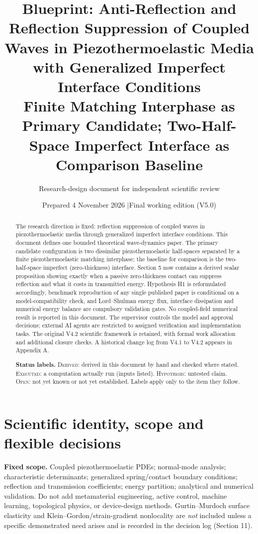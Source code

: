 \documentclass[11pt]{article}
\title{Blueprint: Anti-Reflection and Reflection Suppression of Coupled
Waves in Piezothermoelastic Media with Generalized Imperfect Interface
Conditions\\[6pt]
\large Finite Matching Interphase as Primary Candidate; Two-Half-Space
Imperfect Interface as Comparison Baseline}
\author{Research-design document for independent scientific review}
\date{Prepared 4 November 2026 \quad$\vert$\quad Final working edition (V5.0)}
\begin{document}
\maketitle

\begin{center}
\end{center}

\begin{abstract}
The research direction is fixed: reflection suppression of coupled waves in
piezothermoelastic media through generalized imperfect interface conditions.
This document defines one bounded theoretical wave-dynamics paper. The primary
candidate configuration is two dissimilar piezothermoelastic half-spaces
separated by a finite piezothermoelastic matching interphase; the baseline for
comparison is the two-half-space imperfect (zero-thickness) interface. Section 5
now contains a derived scalar proposition showing exactly when a passive
zero-thickness contact can suppress reflection and what it costs in transmitted
energy. Hypothesis H1 is reformulated accordingly, benchmark reproduction of any
single published paper is conditional on a model-compatibility check, and
Lord--Shulman energy flux, interface dissipation and numerical energy balance
are compulsory validation gates. No coupled-field numerical result is reported in
this document. The supervisor controls the model and approval decisions; external
AI agents are restricted to assigned verification and implementation tasks. The
original V4.2 scientific framework is retained, with formal work allocation and
additional closure checks. A historical change log from V4.1 to V4.2 appears in
Appendix A.

\medskip
\noindent\textbf{Status labels.} \textsc{Derived}: derived in this document by
hand and checked where stated. \textsc{Executed}: a computation actually run
(inputs listed). \textsc{Hypothesis}: untested claim. \textsc{Open}: not yet
known or not yet established. Labels apply only to the item they follow.
\end{abstract}

\section{Scientific identity, scope and flexible decisions}

\textbf{Fixed scope.} Coupled piezothermoelastic PDEs; normal-mode analysis;
characteristic determinants; generalized spring/contact boundary conditions;
reflection and transmission coefficients; energy partition; analytical and
numerical validation. Do not add metamaterial engineering, active control,
machine learning, topological physics, or device-design methods.
Gurtin--Murdoch surface elasticity and Klein--Gordon/strain-gradient nonlocality
are \emph{not} included unless a specific demonstrated need arises and is recorded
in the decision log (Section 11).
\end{document}

